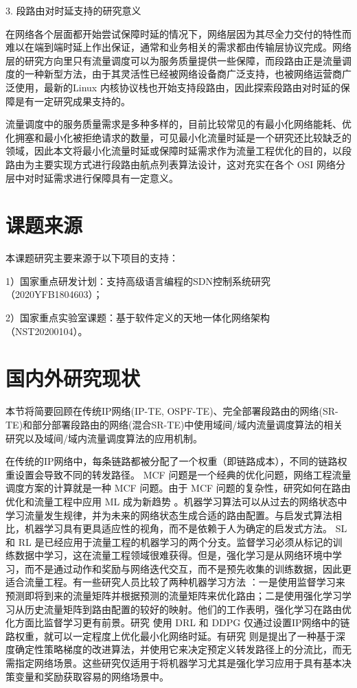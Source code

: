3. 段路由对时延支持的研究意义

在网络各个层面都开始尝试保障时延的情况下，网络层因为其尽全力交付的特性而难以在端到端时延上作出保证，通常和业务相关的需求都由传输层协议完成。网络层的研究方向里只有流量调度可以为服务质量提供一些保障，而段路由正是流量调度的一种新型方法，由于其灵活性已经被网络设备商广泛支持，也被网络运营商广泛使用，最新的Linux \cite{LINUXSRv6} 内核协议栈也开始支持段路由，因此探索段路由对时延的保障是有一定研究成果支持的。

流量调度中的服务质量需求是多种多样的，目前比较常见的有最小化网络能耗、优化拥塞和最小化被拒绝请求的数量，可见最小化流量时延是一个研究还比较缺乏的领域，因此本文将最小化流量时延或保障时延需求作为流量工程优化的目的，以段路由为主要实现方式进行段路由航点列表算法设计，这对充实在各个 \gls*{OSI} 网络分层中对时延需求进行保障具有一定意义。

\section{课题来源}
本课题研究主要来源于以下项目的支持：

1）国家重点研发计划：支持高级语言编程的SDN控制系统研究（2020YFB1804603）；

2）国家重点实验室课题：基于软件定义的天地一体化网络架构（NST20200104）。

\section{国内外研究现状}

本节将简要回顾在传统IP网络(IP-TE, OSPF-TE)、完全部署段路由的网络(SR-TE)和部分部署段路由的网络(混合SR-TE)中使用域间/域内流量调度算法的相关研究以及域间/域内流量调度算法的应用机制。

在传统的IP网络中，每条链路都被分配了一个权重（即链路成本），不同的链路权重设置会导致不同的转发路径。 \gls*{MCF} 问题是一个经典的优化问题，网络工程流量调度方案的计算就是一种 \gls*{MCF} 问题。由于 \gls*{MCF} 问题的复杂性，研究如何在路由优化和流量工程中应用 \gls*{ML} 成为新趋势 \cite{MLALNET} 。机器学习算法可以从过去的网络状态中学习流量发生规律，并为未来的网络状态生成合适的路由配置。与启发式算法相比，机器学习具有更具适应性的视角，而不是依赖于人为确定的启发式方法。 \gls*{SL} 和 \gls*{RL} 是已经应用于流量工程的机器学习的两个分支。监督学习必须从标记的训练数据中学习，这在流量工程领域很难获得。但是，强化学习是从网络环境中学习，而不是通过动作和奖励与网络迭代交互，而不是预先收集的训练数据，因此更适合流量工程。有一些研究人员比较了两种机器学习方法 \cite{MLALNET} ：一是使用监督学习来预测即将到来的流量矩阵并根据预测的流量矩阵来优化路由；二是使用强化学习学习从历史流量矩阵到路由配置的较好的映射。他们的工作表明，强化学习在路由优化方面比监督学习更有前景。研究 \cite{MLSR2} 使用 \gls*{DRL} 和 \gls*{DDPG} \cite{MLSR3} 仅通过设置IP网络中的链路权重，就可以一定程度上优化最小化网络时延。有研究 \cite{MLSR1} 则是提出了一种基于深度确定性策略梯度的改进算法，并使用它来决定预定义转发路径上的分流比，而无需指定网络场景。这些研究仅适用于将机器学习尤其是强化学习应用于具有基本决策变量和奖励获取容易的网络场景中。

